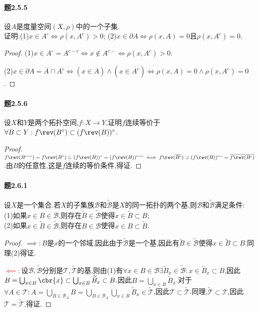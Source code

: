 \documentclass{article}
\begin{document}
\paragraph{题2.5.5}设$A$是度量空间$(X,\rho)$中的一个子集.\\
证明:(1)$x\in A^\circ\iff \rho(x,A^c)>0$;
(2)$x\in \partial A\iff \rho(x,A)=0$且$\rho(x,A^c)=0$.
\begin{proof}
    (1)$x\in A^\circ=A^{c-c}\iff x\notin A^{c-}\iff \rho(x,A^c)>0$.

    (2)$x\in \partial A=\overline{A}\cap\overline{A^c}\iff (x\in \overline{A})\land (x\in \overline{A^c})\iff \rho(x,A)=0\land \rho(x,A^c)=0$.
\end{proof}

\paragraph{题2.5.6}设$X$和$Y$是两个拓扑空间,$f:X\to Y$,证明$f$连续等价于$\forall B\subset Y: f\rev(B^\circ)\subset (f\rev(B))^\circ$.
\begin{proof}
    $f\rev(B^{c-c})=f\rev(B^\circ)\subset (f\rev(B))^\circ=(f\rev(B))^{c-c}\iff f\rev(\overline{B^c})\supset (f\rev(B))^{c-}=\overline{f\rev(B^c)}$.由$B$的任意性,这是$f$连续的等价条件,得证.
\end{proof}

\paragraph{题2.6.1}设$X$是一个集合.若$X$的子集族$\mathscr{B}$和$\widetilde{\mathscr{B}}$是$X$的同一拓扑的两个基,则$\mathscr{B}$和$\widetilde{\mathscr{B}}$满足条件:\\
(1)如果$x\in B\in \mathscr{B}$,则存在$\widetilde{B}\in \widetilde{\mathscr{B}}$使得$x\in \widetilde{B}\subset B$;\\(2)如果$x\in \widetilde{B}\in \widetilde{\mathscr{B}}$,则存在$B\in\mathscr{B}$使得$x\in B\subset \widetilde{B}$.
\begin{proof}
    $\implies:B$是$x$的一个邻域,因此由于$\widetilde{\mathscr{B}}$是一个基,因此有$\widetilde{B}\in\widetilde{\mathscr{B}}$使得$x\in \widetilde{B}\subset B$.同理(2)得证.

    \textcolor{red}{$\impliedby:$}设$\mathscr{B},\widetilde{\mathscr{B}}$分别是$\mathscr{T},\widetilde{\mathscr{T}}$的基,则由(1)有$\forall x\in B\in \mathscr{B}\exists \widetilde{B}_x\in\widetilde{\mathscr{B}}:x\in \widetilde{B}_x\subset B$,因此$B=\bigcup_{x\in B}\cbr{x}\subset \bigcup_{x\in B}\widetilde{B}_x\subset B$,因此$B=\bigcup_{x\in B}\widetilde{B}_x$.对于$\forall A\in\mathscr{T}:A=\bigcup_{B\in \mathscr{B}_A}B=\bigcup_{B\in \mathscr{B}_A}\bigcup_{x\in B}\widetilde{B}_x\in \widetilde{\mathscr{T}}$,因此$\mathscr{T}\subset \widetilde{\mathscr{T}}$.同理,$\widetilde{\mathscr{T}}\subset \mathscr{T}$,因此$\mathscr{T}=\widetilde{\mathscr{T}}$,得证.
\end{proof}
\end{document}
